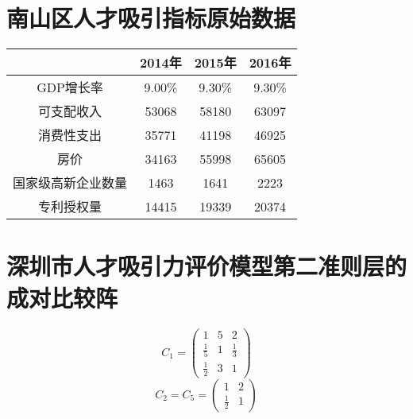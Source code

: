 \documentclass[withoutpreface,bwprint]{cumcmthesis} %
\begin{document}
\section{南山区人才吸引指标原始数据}
\begin{table}[htbp]
  \centering
    \begin{tabular}{|c|c|c|c|}
    \toprule
      & 2014年 & 2015年 & 2016年 \\
    \midrule
    GDP增长率 & 9.00\% & 9.30\% & 9.30\% \\
    \midrule
    可支配收入 & 53068 & 58180 & 63097 \\
    \midrule
    消费性支出 & 35771 & 41198 & 46925 \\
    \midrule
    房价 & 34163 & 55998 & 65605 \\
    \midrule
    国家级高新企业数量 & 1463 & 1641 & 2223 \\
    \midrule
    专利授权量 & 14415 & 19339 & 20374 \\
    \bottomrule
    \end{tabular}%
  \label{tab:addlabel}%
\end{table}%
 \section{深圳市人才吸引力评价模型第二准则层的成对比较阵}
\begin{equation}{C_1} = \left( {\begin{array}{*{20}{c}}
1&5&2\\
{\frac{1}{5}}&1&{\frac{1}{3}}\\
{\frac{1}{2}}&3&1
\end{array}} \right)\end{equation}                  
\begin{equation}{C_2} = {C_5} = \left( {\begin{array}{*{20}{c}}
1&2\\
{\frac{1}{2}}&1
\end{array}} \right)\end{equation}

\newpage
\end{document}
